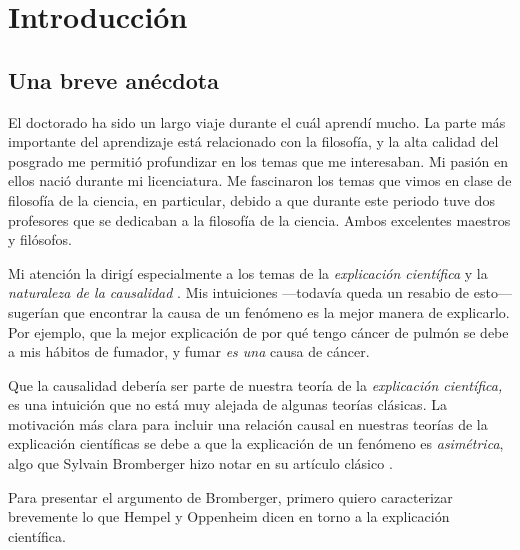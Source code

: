 
\chapter*{Introducción}
\label{ch:introduction}

\section{Una breve anécdota}

\noindent El doctorado ha sido un largo viaje durante el cuál
aprendí mucho. La parte más importante del aprendizaje está
relacionado con la filosofía, y la alta calidad del posgrado me permitió profundizar en los
temas que me interesaban. Mi pasión en ellos nació durante mi
licenciatura. Me fascinaron los temas que vimos en clase de
filosofía de la ciencia, en particular, debido a que durante este
periodo tuve dos profesores que se dedicaban a la filosofía de la
ciencia. Ambos excelentes maestros y filósofos.

Mi atención la dirigí especialmente a los temas de la \emph
{explicación científica} y la \emph{naturaleza de la causalidad
}. Mis intuiciones ---todavía queda un resabio de esto--- sugerían
que encontrar la causa de un fenómeno es la mejor manera de
explicarlo. Por ejemplo, que la mejor explicación de por qué tengo
cáncer de pulmón se debe a mis hábitos de fumador, y fumar \emph{es
	una} causa de cáncer.

Que la causalidad debería ser parte de nuestra teoría de la
\emph{explicación científica,} es una intuición que no está muy
alejada de algunas teorías clásicas. La motivación más clara para
incluir una relación causal en nuestras teorías de la explicación
científicas se debe a que la explicación de un fenómeno es \emph
{asimétrica}, algo que Sylvain Bromberger \citeyear{Bromberger1966}
hizo notar en su artículo clásico .

Para presentar el argumento de Bromberger, primero quiero
caracterizar brevemente lo que Hempel y Oppenheim dicen en torno a
la explicación científica.

